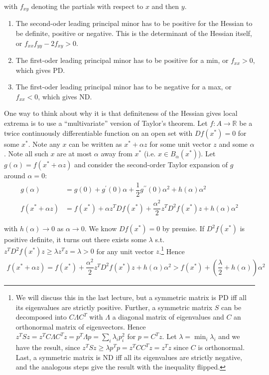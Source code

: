 \documentclass{article}
\begin{document}
with $f_{xy}$ denoting the partials with respect to $x$ and then $y$.
\begin{enumerate}
  \item The second-oder leading principal minor has to be positive for the Hessian to be definite, positive or negative. This is the determinant of the Hessian itself, or $f_{xx} f_{yy} - 2 f_{xy} > 0$.

  \item The first-oder leading principal minor has to be positive for a min, or $f_{xx} > 0$, which gives PD.

  \item The first-oder leading principal minor has to be negative for a max, or $f_{xx} < 0$, which gives ND.
\end{enumerate}

\begin{remark}
  One way to think about why it is that definiteness of the Hessian gives local extrema is to use a ``multivariate'' version of Taylor's theorem. Let $f: A \to \mathbb{R}$ be a twice continuously differentiable function on an open set with $Df(x^*) = 0$ for some $x^*$. Note any $x$ can be written as $x^* + \alpha z$ for some unit vector $z$ and some $\alpha$. Note all such $x$ are at most $\alpha$ away from $x^*$ (i.e. $x \in B_{\alpha}(x^*)$). Let $g(\alpha) = f(x^* + \alpha z)$ and consider the second-order Taylor expansion of $g$ around $\alpha = 0$:
  \begin{align*}
    g(\alpha)
    &
    =
    g(0)
    +
    g^\prime(0) \alpha
    +
    \dfrac{1}{2} g^{\prime\prime}(0) \alpha^2
    +
    h(\alpha) \alpha^2
    \\
    f(x^* + \alpha z)
    &
    =
    f(x^*)
    +
    \alpha z^T Df(x^*)
    +
    \dfrac{\alpha^2}{2}
    z^T D^2f(x^*) z
    +
    h(\alpha) \alpha^2
  \end{align*}

  with $h(\alpha) \to 0$ as $\alpha \to 0$. We know $Df(x^*) = 0$ by premise. If $D^2f(x^*)$ is positive definite, it turns out there exists some $\lambda$ s.t. $z^T D^2f(x^*) z \ge \lambda z^T z = \lambda > 0$ for any unit vector $z$.\footnote{We will discuss this in the last lecture, but a symmetric matrix is PD iff all its eigenvalues are strictly positive. Further, a symmetric matrix $S$ can be decomposed into $C \Lambda C^T$ with $\Lambda$ a diagonal matrix of eigenvalues and $C$ an orthonormal matrix of eigenvectors. Hence $z^T S z = z^T C \Lambda C^T z = p^T \Lambda p = \sum_{i} \lambda_i p_i^2$ for $p = C^T z$. Let $\lambda = \min_i \lambda_i$ and we have the result, since $z^T S z \ge \lambda p^T p = z^T C C^T z = z^T z$ since $C$ is orthonormal. Last, a symmetric matrix is ND iff all its eigenvalues are strictly negative, and the analogous steps give the result with the inequality flipped.} Hence
  \begin{align*}
    f(x^* + \alpha z)
    =
    f(x^*)
    +
    \dfrac{\alpha^2}{2}
    z^T D^2f(x^*) z
    +
    h(\alpha) \alpha^2
    >
    f(x^*)
    +
    \left(
      \dfrac{\lambda}{2} + h(\alpha)
    \right) \alpha^2
  \end{align*}


\end{remark}
\end{document}
